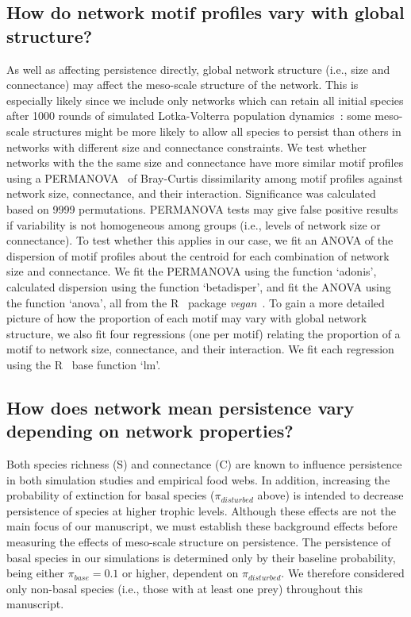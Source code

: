 \documentclass[12pt]{article}
\begin{document}
\begin{spacing}{2.0}
        \subsection*{How do network motif profiles vary with global structure?}
        
            As well as affecting persistence directly, global network structure (i.e., size and connectance) may affect the meso-scale structure of the network.
            This is especially likely since we include only networks which can retain all initial species after 1000 rounds of simulated Lotka-Volterra population dynamics~\citep{Cirtwill2021_inprep}:  some meso-scale structures might be more likely to allow all species to persist than others in networks with different size and connectance constraints.
            We test whether networks with the the same size and connectance have more similar motif profiles using a PERMANOVA~\citep{Anderson2001} of Bray-Curtis dissimilarity among motif profiles against network size, connectance, and their interaction.
            Significance was calculated based on 9999 permutations.
            PERMANOVA tests may give false positive results if variability is not homogeneous among groups (i.e., levels of network size or connectance).
            To test whether this applies in our case, we fit an ANOVA of the dispersion of motif profiles about the centroid for each combination of network size and connectance. 
            We fit the PERMANOVA using the function `adonis', calculated dispersion using the function `betadisper', and fit the ANOVA using the function `anova', all from the R~\citep{R} package \emph{vegan}~\citep{vegan}.
            To gain a more detailed picture of how the proportion of each motif may vary with global network structure, we also fit four regressions (one per motif) relating the proportion of a motif to network size, connectance, and their interaction.
            We fit each regression using the R~\citep{R} base function `lm'.
            

        \subsection*{How does network mean persistence vary depending on network properties?}
        
            Both species richness (S) and connectance (C) are known to influence persistence in both simulation studies and empirical food webs.
            In addition, increasing the probability of extinction for basal species ($\pi_{disturbed}$ above) is intended to decrease persistence of species at higher trophic levels.
            Although these effects are not the main focus of our manuscript, we must establish these background effects before measuring the effects of meso-scale structure on persistence.
            The persistence of basal species in our simulations is determined only by their baseline probability, being either $\pi_{base} = 0.1$ or higher, dependent on $\pi_{disturbed}$.
            We therefore considered only non-basal species (i.e., those with at least one prey) throughout this manuscript.


\end{spacing}
\end{document}
